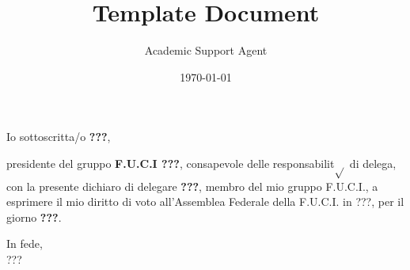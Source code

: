 \documentclass{article}
\title{Template Document}
\author{Academic Support Agent}
\date{\today}
\begin{document}
\maketitle

\vspace{25pt}

\noindent
Io sottoscritta/o \textbf{???},

\vspace{25pt}

\noindent
presidente del gruppo \textbf{F.U.C.I ???}, consapevole delle responsabilit$\sqrt{}$  di
delega, con la presente dichiaro di delegare \textbf{???}, membro del mio gruppo
F.U.C.I., a esprimere il mio diritto di voto all'Assemblea Federale della
F.U.C.I. in ???, per il giorno \textbf{???}.

\vspace{25pt}

\begin{flushright}
  In fede, \\
  ???
\end{flushright}
\end{document}
